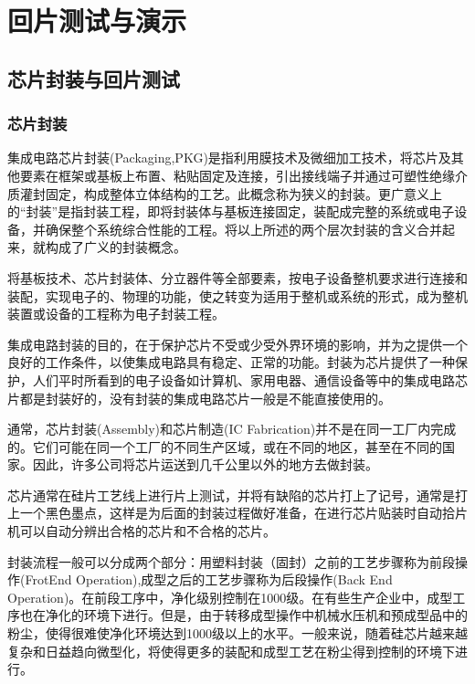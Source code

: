 
\chapter{回片测试与演示}\label{chap:18-test-and-show}

\section{芯片封装与回片测试}\label{sec:18-test-and-show-001}

\subsection{芯片封装}\label{sec:18-test-and-show-002}

集成电路芯片封装(Packaging,PKG)是指利用膜技术及微细加工技术，将芯片及其他要素在框架或基板上布置、粘贴固定及连接，引出接线端子并通过可塑性绝缘介质灌封固定，构成整体立体结构的工艺。此概念称为狭义的封装。更广意义上的``封装''是指封装工程，即将封装体与基板连接固定，装配成完整的系统或电子设备，并确保整个系统综合性能的工程。将以上所述的两个层次封装的含义合并起来，就构成了广义的封装概念。

将基板技术、芯片封装体、分立器件等全部要素，按电子设备整机要求进行连接和装配，实现电子的、物理的功能，使之转变为适用于整机或系统的形式，成为整机装置或设备的工程称为电子封装工程。

集成电路封装的目的，在于保护芯片不受或少受外界环境的影响，并为之提供一个良好的工作条件，以使集成电路具有稳定、正常的功能。封装为芯片提供了一种保护，人们平时所看到的电子设备如计算机、家用电器、通信设备等中的集成电路芯片都是封装好的，没有封装的集成电路芯片一般是不能直接使用的。

通常，芯片封装(Assembly)和芯片制造(IC Fabrication)并不是在同一工厂内完成的。它们可能在同一个工厂的不同生产区域，或在不同的地区，甚至在不同的国家。因此，许多公司将芯片运送到几千公里以外的地方去做封装。

芯片通常在硅片工艺线上进行片上测试，并将有缺陷的芯片打上了记号，通常是打上一个黑色墨点，这样是为后面的封装过程做好准备，在进行芯片贴装时自动拾片机可以自动分辨出合格的芯片和不合格的芯片。

封装流程一般可以分成两个部分：用塑料封装（固封）之前的工艺步骤称为前段操作(FrotEnd Operation),成型之后的工艺步骤称为后段操作(Back End Operation)。在前段工序中，净化级别控制在1000级。在有些生产企业中，成型工序也在净化的环境下进行。但是，由于转移成型操作中机械水压机和预成型品中的粉尘，使得很难使净化环境达到1000级以上的水平。一般来说，随着硅芯片越来越复杂和日益趋向微型化，将使得更多的装配和成型工艺在粉尘得到控制的环境下进行。

